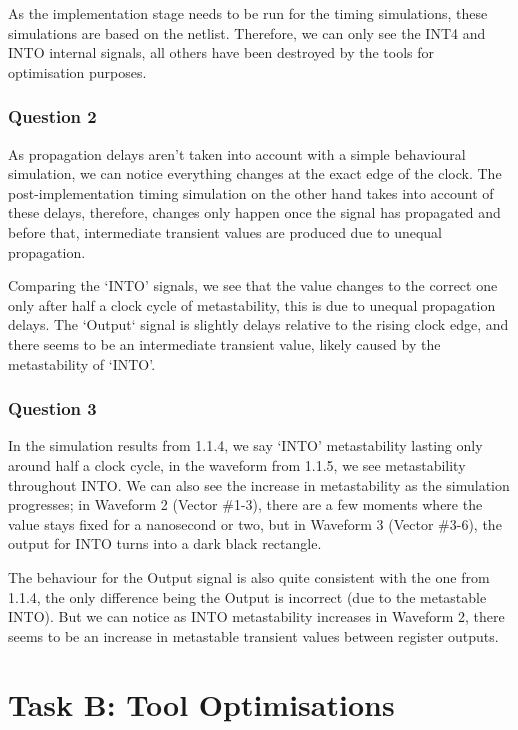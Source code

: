 \documentclass[11pt]{report}
\begin{document}
As the implementation stage needs to be run for the timing simulations, these simulations are based on the netlist. Therefore, we can only see the INT4 and INTO internal signals, all others have been destroyed by the tools for optimisation purposes.

\subsection*{Question 2}
As propagation delays aren't taken into account with a simple behavioural simulation, we can notice everything changes at the exact edge of the clock. The post-implementation timing simulation on the other hand takes into account of these delays, therefore, changes only happen once the signal has propagated and before that, intermediate transient values are produced due to unequal propagation.

Comparing the `INTO' signals, we see that the value changes to the correct one only after half a clock cycle of metastability, this is due to unequal propagation delays. The `Output` signal is slightly delays relative to the rising clock edge, and there seems to be an intermediate transient value, likely caused by the metastability of `INTO'.

\subsection*{Question 3}
In the simulation results from 1.1.4, we say `INTO' metastability lasting only around half a clock cycle, in the waveform from 1.1.5, we see metastability throughout INTO. We can also see the increase in metastability as the simulation progresses; in Waveform 2 (Vector \#1-3), there are a few moments where the value stays fixed for a nanosecond or two, but in Waveform 3 (Vector \#3-6), the output for INTO turns into a dark black rectangle.

The behaviour for the Output signal is also quite consistent with the one from 1.1.4, the only difference being the Output is incorrect (due to the metastable INTO). But we can notice as INTO metastability increases in Waveform 2, there seems to be an increase in metastable transient values between register outputs.


\chapter*{Task B: Tool Optimisations}
\end{document}
